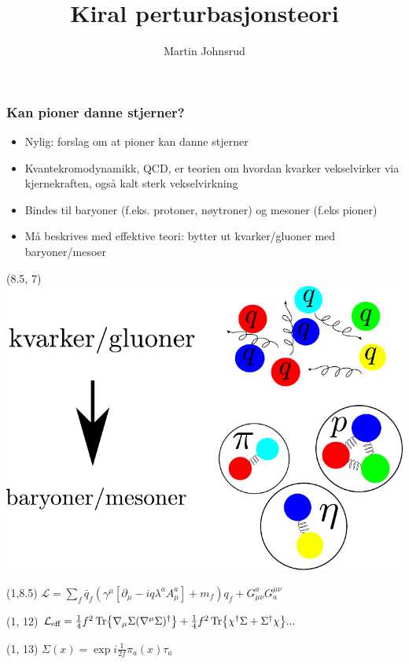 \documentclass[aspectratio=169]{beamer}
\title{Kiral perturbasjonsteori}
\author{Martin Johnsrud}
\begin{document}

    \begin{frame}
        \frametitle{Kan pioner danne stjerner?}
        \begin{itemize}
            \vspace{-3cm}
            \item Nylig: forslag om at pioner kan danne stjerner
            \item Kvantekromodynamikk, QCD, er teorien om hvordan kvarker vekselvirker via kjernekraften, også kalt sterk vekselvirkning
            \item Bindes til baryoner (f.eks. protoner, nøytroner) og mesoner (f.eks pioner)
            \item Må beskrives med effektive teori: bytter ut kvarker/gluoner med baryoner/mesoer
        \end{itemize}

        \begin{textblock}{6}(8.5, 7)
            \includegraphics[width=\textwidth]{figurer/quarks-to-mesons.pdf}
        \end{textblock}

        \scriptsize{
        \begin{textblock}{10}(1,8.5)
            $
            \mathcal L = 
            \sum_f \bar q_f (\gamma^\mu [\partial_\mu - i q \lambda^a A^a_\mu ] + m_f)q_f
            + G^a_{\mu \nu} G_a^{\mu \nu}
            $
        \end{textblock}

        \begin{textblock}{8}(1, 12)
            $
            \mathcal L_\text{eff}
            =
            \frac{1}{4} f^2 \Tr{\nabla_\mu \Sigma (\nabla^\mu \Sigma)^\dagger}
            + \frac{1}{4} f^2 \Tr{\chi^\dagger \Sigma + \Sigma^\dagger \chi} 
            ...
            $
        \end{textblock}
        \begin{textblock}{15}(1, 13)
            $
            \Sigma(x) = \exp{ i \frac{1}{2f} \pi_a(x) \tau_a}
            $
        \end{textblock}
        
    }
    \end{frame}
\end{document}
